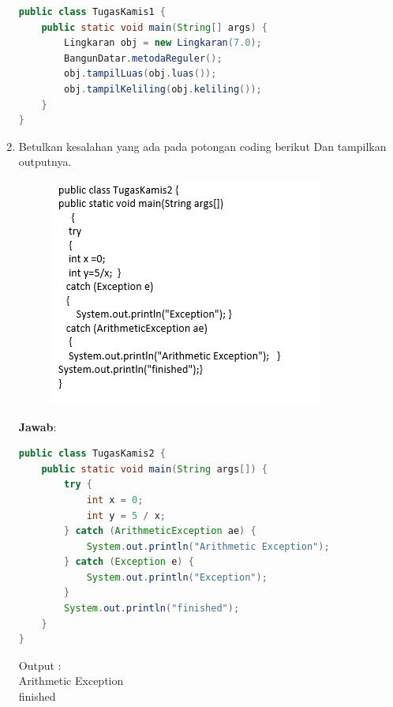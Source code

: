\documentclass[a4paper, 12pt]{article}
\newcommand{\ans}{\textbf{Jawab}:}
\begin{document}
\begin{enumerate}
\begin{lstlisting}[language=java, breaklines=true]
public class TugasKamis1 {
    public static void main(String[] args) {
        Lingkaran obj = new Lingkaran(7.0);
        BangunDatar.metodaReguler();
        obj.tampilLuas(obj.luas());
        obj.tampilKeliling(obj.keliling());
    }
}

        \end{lstlisting}

        \newpage
        \item Betulkan kesalahan yang ada pada potongan coding berikut Dan tampilkan outputnya.
        \begin{figure}[h]
            \centering
            \includegraphics[width=0.6\linewidth]{No2.png}
        \end{figure}

        \newpage
        \ans
        \begin{lstlisting}[language=java, breaklines=true]
public class TugasKamis2 {
    public static void main(String args[]) {
        try {
            int x = 0;
            int y = 5 / x;
        } catch (ArithmeticException ae) {
            System.out.println("Arithmetic Exception");
        } catch (Exception e) {
            System.out.println("Exception");
        }
        System.out.println("finished");
    }
}

        \end{lstlisting}

        Output : \\
        Arithmetic Exception\\
        finished



\end{enumerate}
\end{document}
